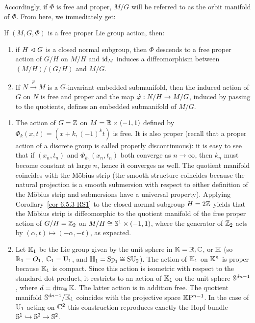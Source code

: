 Accordingly, if $\Phi$ is free and proper, $M\slash G$ will be referred to as the orbit manifold of $\Phi$. From here, we immediately get:

\begin{cor}[{{\cite[Cor.~6.5.3]{RS1}}}]\label{cor 6.5.3 RS1}
    If $(M,G,\Phi)$ is a free proper Lie group action, then:
    \begin{enumerate}
        \item if $H\vartriangleleft G$ is a closed normal subgroup, then $\Phi$ descends to a free proper action of $G\slash H$ on $M\slash H$ and $\operatorname{id}_M$ induces a diffeomorphism between $(M\slash H)\slash (G\slash H)$ and $M\slash G$.
        \item If $N\overset{\varphi}{\to}M$ is a $G$-invariant embedded submanifold, then the induced action of $G$ on $N$ is free and proper and the map $\wh{\varphi}:N\slash H\to M\slash G$, induced by passing to the quotients, defines an embedded submanifold of $M\slash G$.
    \end{enumerate}
\end{cor}

\begin{example}[{{\cite[Example~6.5.4]{RS1}}}]
    \begin{enumerate}
        \item The action of $G=\mathbb{Z}$ on $M=\mathbb{R}\times (-1,1)$ defined by $\Phi_k(x,t)=(x+k,(-1)^kt)$ is free. It is also proper (recall that a proper action of a discrete group is called properly discontinuous): it is easy to see that if $(x_n,t_n)$ and $\Phi_{k_n}(x_n,t_n)$ both converge as $n\to \infty$, then $k_n$ must become constant at large $n$, hence it converges as well. The quotient manifold coincides with the M\"obius strip (the smooth structure coincides because the natural projection is a smooth submersion with respect to either definition of the M\"obius strip and submersions have a universal property). Applying Corollary~\ref{cor 6.5.3 RS1} to the closed normal subgroup $H=2\mathbb{Z}$ yields that the M\"obius strip is diffeomorphic to the quotient manifold of the free proper action of $G\slash H=\mathbb{Z}_2$ on $M\slash H\cong \mathbb{S}^1\times (-1,1)$, where the generator of $\mathbb{Z}_2$ acts by $(\alpha,t)\mapsto (-\alpha,-t)$, as expected.
        \item Let $\mathbb{K}_1$ be the Lie group given by the unit sphere in $\mathbb{K}=\mathbb{R},\mathbb{C}$, or $\mathbb{H}$ (so $\mathbb{R}_1=O_1$, $\mathbb{C}_1=\operatorname{U}_1$, and $\mathbb{H}_1=\operatorname{Sp}_1\cong \operatorname{SU}_2$). The action of $\mathbb{K}_1$ on $\mathbb{K}^n$ is proper because $\mathbb{K}_1$ is compact. Since this action is isometric with respect to the standard dot product, it restricts to an action of $\mathbb{K}_1$ on the unit sphere $\mathbb{S}^{dn-1}$, where $d=\dim_{\mathbb{R}}\mathbb{K}$. The latter action is in addition free. The quotient manifold $\mathbb{S}^{dn-1}\slash\mathbb{K}_1$ coincides with the projective space $\mathbb{K}\mathrm{P}^{n-1}$. In the case of $\operatorname{U}_1$ acting on $\mathbb{C}^2$ this construction reproduces exactly the Hopf bundle $\mathbb{S}^1\hookrightarrow \mathbb{S}^3\to \mathbb{S}^2.$
    \end{enumerate}
\end{example}


